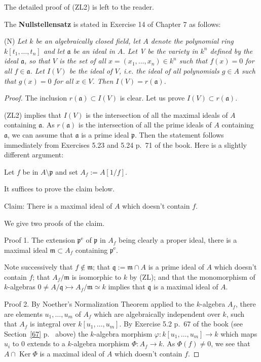 \documentclass[parskip=half,fontsize=12pt]{scrartcl}%
\newcommand{\oo}{\operatorname}\newcommand{\ooo}{\operatorname*}
\newcommand{\mf}{\mathfrak}
\newcommand{\aaa}{\mf a}
\newcommand{\mmm}{\mf m}
\newcommand{\ppp}{\mf p}
\newcommand{\qqq}{\mf q}
\newcommand{\mono}{\rightarrowtail}
\begin{document}
The detailed proof of (ZL2) is left to the reader.

The \textbf{Nullstellensatz} is stated in Exercise 14 of Chapter 7 as follows:

(N) \emph{Let $k$ be an algebraically closed field, let $A$ denote the polynomial ring $k[t_1,\dots,t_n]$ and let $\aaa$ be an ideal in $A$. Let V be the variety in $k^n$ defined by the ideal $\aaa$, so that $V$ is the set of all $x=(x_1,\dots,x_n)\in k^n$ such that $f(x)=0$ for all $f\in\aaa$. Let $I(V)$ be the ideal of $V$, i.e. the ideal of all polynomials $g\in A$ such that $g(x)=0$ for all $x\in V$. Then $I(V)=r(\aaa)$.}

\begin{proof} 
The inclusion $r(\aaa)\subset I(V)$ is clear. Let us prove $I(V)\subset r(\aaa)$. 

(ZL2) implies that $I(V)$ is the intersection of all the maximal ideals of $A$ containing $\aaa$. As $r(\aaa)$ is the intersection of all the prime ideals of $A$ containing $\aaa$, we can assume that $\aaa$ is a prime ideal $\ppp$. Then the statement follows immediately from Exercises 5.23 and 5.24 p.~71 of the book. Here is a slightly different argument:

Let $f$ be in $A\setminus\ppp$ and set $A_f:=A[1/f]$.

It suffices to prove the claim below.

Claim: There is a maximal ideal of $A$ which doesn't contain $f$. 

We give two proofs of the claim.

Proof 1. The extension $\ppp^{\oo e}$ of $\ppp$ in $A_f$ being clearly a proper ideal, there is a maximal ideal $\mmm\subset A_f$ containing $\ppp^{\oo e}$. 

Note successively that $f\notin\mmm$; that $\qqq:=\mmm\cap A$ is a prime ideal of $A$ which doesn't contain $f$; that $A_f/\mmm$ is isomorphic to $k$ by (ZL); and that the monomorphism of $k$-algebras $0\ne A/\qqq\mono A_f/\mmm\simeq k$ implies that $\qqq$ is a maximal ideal of $A$.

Proof 2. By Noether's Normalization Theorem applied to the $k$-algebra $A_f$, there are elements $u_1,\dots,u_m$ of $A_f$ which are algebraically independent over $k$, such that $A_f$ is integral over $k[u_1,\dots,u_m]$. By Exercise 5.2 %
p.~67 of the book (see Section~\ref{67} p.~\pageref{67} above) the $k$-algebra morphism $\varphi:k[u_1,\dots,u_m]\to k$ which maps $u_i$ to $0$ extends to a $k$-algebra morphism $\Phi:A_f\to k$. As $\Phi(f)\ne0$, we see that $A\cap\oo{Ker}\Phi$ is a maximal ideal of $A$ which doesn't contain $f$.
\end{proof}
\end{document}
